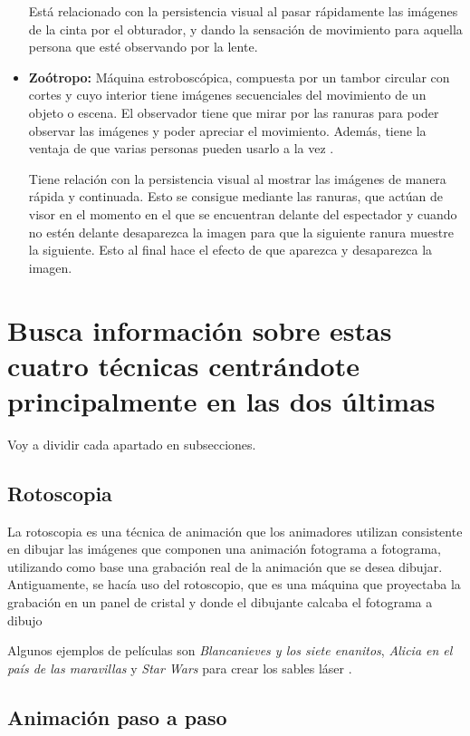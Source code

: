 \documentclass{article}
\begin{document}
\begin{itemize}
    Está relacionado con la persistencia visual al pasar rápidamente las imágenes de la cinta por el obturador, y dando la sensación de movimiento para aquella persona que esté observando por la lente.

    \item \textbf{Zoótropo: }Máquina estroboscópica, compuesta por un tambor circular con cortes y cuyo interior tiene imágenes secuenciales del movimiento de un objeto o escena. El observador tiene que mirar por las ranuras para poder observar las imágenes y poder apreciar el movimiento. Además, tiene la ventaja de que varias personas pueden usarlo a la vez \cite{zoo}.
    
    Tiene relación con la persistencia visual al mostrar las imágenes de manera rápida y continuada. Esto se consigue mediante las ranuras, que actúan de visor en el momento en el que se encuentran delante del espectador y cuando no estén delante desaparezca la imagen para que la siguiente ranura muestre la siguiente. Esto al final hace el efecto de que aparezca y desaparezca la imagen.
\end{itemize}


\section{Busca información sobre estas cuatro técnicas centrándote principalmente en las dos últimas}

Voy a dividir cada apartado en subsecciones.

\subsection{Rotoscopia}

La rotoscopia es una técnica de animación que los animadores utilizan consistente en dibujar las imágenes que componen una animación fotograma a fotograma, utilizando como base una grabación real de la animación que se desea dibujar. Antiguamente, se hacía uso del rotoscopio, que es una máquina que proyectaba la grabación en un panel de cristal y donde el dibujante calcaba el fotograma a dibujo \cite{rotos}

\bigskip

Algunos ejemplos de películas son \textit{Blancanieves y los siete enanitos}, \textit{Alicia en el país de las maravillas} \cite{pelis} y \textit{Star Wars} para crear los sables láser \cite{rotos}.

\subsection{Animación paso a paso}
\end{document}
